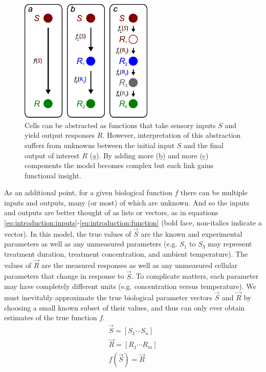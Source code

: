   \begin{figure}[!bt]
  \centering
  \includegraphics[width=2.5in]{FIGS/introduction/function.pdf}
  {\singlespacing 
  \caption[Abstracting signaling as a hierarchy of functions.]
          { Cells can be abstracted as functions that take sensory
			inputs $S$ and yield output responses $R$. However, interpretation of this
			abstraction suffers from unknowns between the initial
			input $S$ and the final output of interest $R$ (\b{a}). By adding
			more (\b{b}) and more (\b{c}) components the model becomes
			complex but each link gains functional insight.}
  \label{fig:introduction:function}}
  \end{figure}


  
As an additional point, for a given biological function $f$ there can be
multiple inputs and outputs, many (or most) of which are unknown.
And so the inputs and outputs are better thought of
as lists or vectors, as in equations
\ref{eq:introduction:inputs}-\ref{eq:introduction:function}
(bold face, non-italics indicate a vector).
In this model, the true
values of $\vec{S}$ are the known and experimental parameters
as well as any unmeasured parameters
(e.g. $S_1$ to $S_3$ may represent treatment duration,
treatment concentration, and ambient temperature). The values
of $\vec{R}$ are the measured responses as well as any unmeasured
cellular parameters that change in response to $\vec{S}$.
To complicate
matters, each parameter may have completely different units
(e.g. concentration versus temperature).
We must inevitably approximate the true
biological parameter vectors $\vec{S}$ and $\vec{R}$
by choosing a small known subset of their values, and
thus can only ever obtain estimates of the true function $f$.
%
    \begin{gather} 
    \vec{S}  = [S_1\cdots S_n] \label{eq:introduction:inputs} \\
    \vec{R}  = [R_1\cdots R_m] \label{eq:introduction:outputs} \\
    f(\vec{S})  =\vec{R} \label{eq:introduction:function}
    \end{gather}


